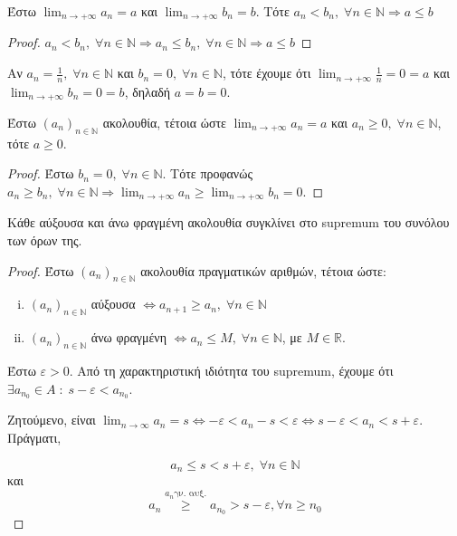 \documentclass[main.tex]{subfiles}
\begin{document}
\begin{prop}
    Έστω $ \lim_{n \to +\infty} a_{n} = a $ και $ \lim_{n \to +\infty} 
    b_{n} = b $. Τότε
    $
    a_{n} < b_{n}, \; \forall n \in \mathbb{N} \Rightarrow a \leq b
    $ 
\end{prop}

\begin{proof}
    $ a_{n}< b_{n}, \; \forall n \in \mathbb{N} \Rightarrow a_{n} \leq 
    b_{n}, \; \forall n \in \mathbb{N} \Rightarrow a \leq b $
\end{proof}

\begin{rem}
\item {}
    Αν $ a_{n}= \frac{1}{n}, \; \forall n \in \mathbb{N} $ 
    και $ b_{n}=0, \; \forall n \in \mathbb{N} $, τότε έχουμε ότι 
    $ \lim_{n \to +\infty} \frac{1}{n} = 0 = a $ και $ \lim_{n \to
    +\infty} b_{n} = 0 = b $, δηλαδή $ a=b=0  $.
\end{rem}

\begin{cor}
    Έστω $ (a_{n})_{n \in \mathbb{N}} $ ακολουθία, τέτοια ώστε 
    $ \lim_{n \to +\infty} a_{n} = a$ και $ a_{n} \geq 0, \; \forall 
    n \in \mathbb{N} $, τότε $ a \geq 0 $.
\end{cor}

\begin{proof}
    Έστω $ b_{n} = 0, \; \forall n \in \mathbb{N} $. Τότε προφανώς 
    $ a_{n} \geq b_{n}, \; \forall n
    \in \mathbb{N} \Rightarrow \lim_{n \to +\infty} a_{n} \geq 
    \lim_{n \to +\infty} b_{n} = 0$.
\end{proof}

\begin{thm}
    Κάθε αύξουσα και άνω φραγμένη ακολουθία συγκλίνει στο 
    supremum του συνόλου των όρων της.
\end{thm}

\begin{proof}
    Έστω $ (a_{n})_{n \in \mathbb{N}} $ ακολουθία πραγματικών αριθμών, 
    τέτοια ώστε:
    \begin{enumerate}[i)]
        \item $ (a_{n})_{n \in \mathbb{N}} $ αύξουσα $ \Leftrightarrow 
            a_{n+1} \geq a_{n}, \; \forall n \in \mathbb{N}$ 
        \item $ (a_{n})_{n \in \mathbb{N}} $ άνω  φραγμένη $ 
            \Leftrightarrow a_{n} \leq M, \; \forall n \in 
            \mathbb{N}$, με $ M \in \mathbb{R} $.
    \end{enumerate}

    Έστω $ \varepsilon >0 $. Από τη χαρακτηριστική ιδιότητα του 
    supremum, έχουμε ότι $ \exists a_{n_{0}} \in A \; : \; s - \varepsilon 
    < a_{n_{0}} $.

    Ζητούμενο, είναι $ \lim_{n \to \infty} a_{n} = s \Leftrightarrow 
    - \varepsilon < a_{n} -s < \varepsilon \Leftrightarrow s - 
    \varepsilon < a_{n} < s + \varepsilon $. Πράγματι, 

    \[ a_{n} \leq s < s + \varepsilon, \; \forall n \in \mathbb{N} \] και 
    \[ a_{n} \overset{a_{n} \text{γν. αυξ.}}{\geq} a_{n_{0}} > s - 
    \varepsilon, \forall n \geq n_{0} \]
\end{proof}
\end{document}

